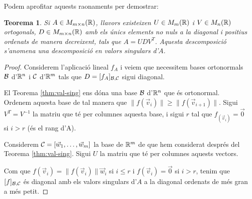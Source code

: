 \documentclass[
  11pt,
]{book}
\numberwithin{dummy}{section}
\theoremstyle{maincolornumbox}
\newtheorem{theorem}{TTTT}[chapter]
\newtheorem{theoremeT}{Teorema}[chapter]
\theoremstyle{blacknumex}
\theoremstyle{blacknumbox}
\theoremstyle{maincolornum}
\renewenvironment{theorem}{\begin{tBox}\begin{theoremeT}}{\end{theoremeT}\end{tBox}}
\newlength\esp
\begin{document}
Podem aprofitar aquests raonaments per demostrar:

\begin{theorem}
\protect\hypertarget{thm:SVD}{}\label{thm:SVD}Si \(A\in M_{m\times n}(\mathbb{R})\), llavors
existeixen \(U \in M_{m}(\mathbb{R})\) i \(V\in M_n(\mathbb{R})\) ortogonals,
\(D\in M_{m\times n}(\mathbb{R})\) amb els únics elements no nuls a la diagonal i
positius ordenats de manera decreixent, tals que \(A=U D V^T\). Aquesta
descomposició s'anomena una \emph{descomposició en valors singulars d'\(A\)}.
\end{theorem}

\begin{proof}
Considerem l'aplicació lineal \(f_A\) i veiem que necessitem
bases ortonormals \(\mathcal{B}\) d'\(\mathbb{R}^n\) i \(\mathcal{C}\) d'\(\mathbb{R}^m\) tals que
\(D=[f_A]_{\mathcal{B},\mathcal{C}}\) sigui diagonal.

El Teorema \ref{thm:val-sing} ens dóna una base \(\mathcal{B}\) d'\(\mathbb{R}^n\) que és
ortonormal. Ordenem aquesta base de tal manera que
\(\|f(\vec v_i)\|\geq \|f(\vec v_{i+1})\|\). Sigui \(V^T=V^{-1}\) la matriu
que té per columnes aquesta base, i sigui \(r\) tal que
\(f_(\vec v_i)=\vec 0\) si \(i>r\) (és el rang d'A).

Considerem \(\mathcal{C}=[\vec w_1, \dots, \vec w_m]\) la base de \(\mathbb{R}^m\) de que
hem considerat després del
Teorema \ref{thm:val-sing}. Sigui \(U\) la matriu que té per columnes
aquests vectors.

Com que \(f(\vec v_i)=\|f(\vec v_i)\| \vec w_i\) si \(i\leq r\) i
\(f(\vec v_i)=\vec 0\) si \(i>r\), tenim que \([f]_{\mathcal{B},\mathcal{C}}\) és diagonal
amb els valors singulars d'\(A\) a la diagonal ordenats de més gran a més
petit.
\end{proof}
\end{document}
